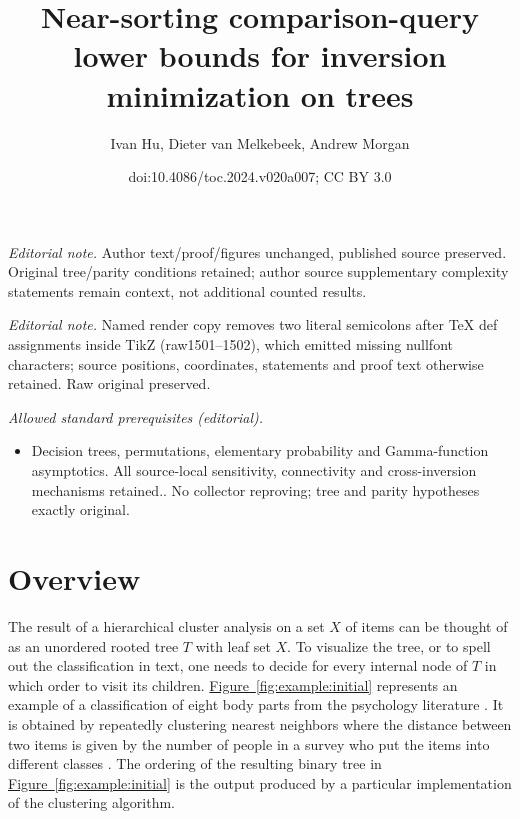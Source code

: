 \documentclass[11pt]{article}
\title{Near-sorting comparison-query lower bounds for inversion minimization on trees}
\author{Ivan Hu, Dieter van Melkebeek, Andrew Morgan}
\date{doi:10.4086/toc.2024.v020a007; CC BY 3.0}
\numberwithin{equation}{section}
\theoremstyle{definition}
\theoremstyle{plain}
\newcommand{\expref}[2]{\hyperref[#2]{#1~\ref{#2}}}
\begin{document}
\maketitle
\noindent\textit{Editorial note.} Author text/proof/figures unchanged, published source preserved. Original tree/parity conditions retained; author source supplementary complexity statements remain context, not additional counted results.\par\medskip
\noindent\textit{Editorial note.} Named render copy removes two literal semicolons after TeX def assignments inside TikZ (raw1501–1502), which emitted missing nullfont characters; source positions, coordinates, statements and proof text otherwise retained. Raw original preserved.\par\medskip
\noindent\textit{Allowed standard prerequisites (editorial).}\begin{itemize}
\item Decision trees, permutations, elementary probability and Gamma-function asymptotics. All source-local sensitivity, connectivity and cross-inversion mechanisms retained.. No collector reproving; tree and parity hypotheses exactly original.
\end{itemize}\medskip
\section{Overview}
\label{sec:overview}

The result of a hierarchical cluster analysis on a set $X$ of items can be thought of as an unordered rooted tree $T$ with leaf set $X$. To visualize the tree, or to spell out the classification in text, one needs to decide for every internal node of $T$ in which order to visit its children. \expref{Figure}{fig:example:initial} represents an example of a classification of eight body parts from the psychology literature \cite{Degerman1982}. It is obtained by repeatedly clustering nearest neighbors where the distance between two items is given by the number of people in a survey who put the items into different classes \cite{Miller1969}. The ordering of the resulting binary tree in \expref{Figure}{fig:example:initial} is the output produced by a particular implementation of the clustering algorithm.  %
%
\end{document}
